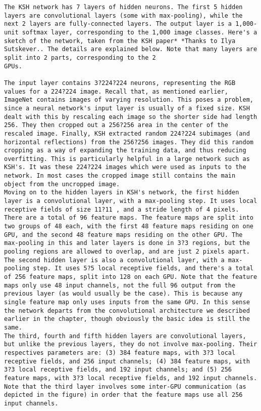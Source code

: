 \begin{lstlisting}
The KSH network has 7 layers of hidden neurons. The first 5 hidden layers are convolutional layers (some with max-pooling), while the next 2 layers are fully-connected layers. The output layer is a 1,000-unit softmax layer, corresponding to the 1,000 image classes. Here's a sketch of the network, taken from the KSH paper* *Thanks to Ilya Sutskever.. The details are explained below. Note that many layers are split into 2 parts, corresponding to the 2
GPUs.

The input layer contains 3?224?224 neurons, representing the RGB values for a 224?224 image. Recall that, as mentioned earlier, ImageNet contains images of varying resolution. This poses a problem, since a neural network's input layer is usually of a fixed size. KSH dealt with this by rescaling each image so the shorter side had length 256. They then cropped out a 256?256 area in the center of the rescaled image. Finally, KSH extracted random 224?224 subimages (and horizontal reflections) from the 256?256 images. They did this random cropping as a way of expanding the training data, and thus reducing overfitting. This is particularly helpful in a large network such as KSH's. It was these 224?224 images which were used as inputs to the network. In most cases the cropped image still contains the main object from the uncropped image.
Moving on to the hidden layers in KSH's network, the first hidden layer is a convolutional layer, with a max-pooling step. It uses local receptive fields of size 11?11 , and a stride length of 4 pixels. There are a total of 96 feature maps. The feature maps are split into two groups of 48 each, with the first 48 feature maps residing on one GPU, and the second 48 feature maps residing on the other GPU. The max-pooling in this and later layers is done in 3?3 regions, but the pooling regions are allowed to overlap, and are just 2 pixels apart.
The second hidden layer is also a convolutional layer, with a max-pooling step. It uses 5?5 local receptive fields, and there's a total of 256 feature maps, split into 128 on each GPU. Note that the feature maps only use 48 input channels, not the full 96 output from the previous layer (as would usually be the case). This is because any single feature map only uses inputs from the same GPU. In this sense the network departs from the convolutional architecture we described earlier in the chapter, though obviously the basic idea is still the same.
The third, fourth and fifth hidden layers are convolutional layers, but unlike the previous layers, they do not involve max-pooling. Their respectives parameters are: (3) 384 feature maps, with 3?3 local receptive fields, and 256 input channels; (4) 384 feature maps, with 3?3 local receptive fields, and 192 input channels; and (5) 256 feature maps, with 3?3 local receptive fields, and 192 input channels. Note that the third layer involves some inter-GPU communication (as depicted in the figure) in order that the feature maps use all 256 input channels.

\end{lstlisting}
